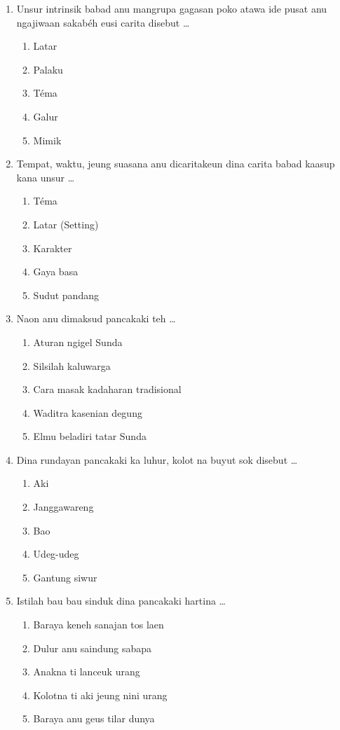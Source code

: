 \documentclass[12pt,a4paper]{article}
\begin{document}
\begin{enumerate}[leftmargin=*]
\item Unsur intrinsik babad anu mangrupa gagasan poko atawa ide pusat anu ngajiwaan sakabéh eusi carita disebut \dots
    \begin{enumerate}[label=\alph*.]
        \item Latar
        \item Palaku
        \item Téma
        \item Galur
        \item Mimik
    \end{enumerate}

\item Tempat, waktu, jeung suasana anu dicaritakeun dina carita babad kaasup kana unsur \dots
    \begin{enumerate}[label=\alph*.]
        \item Téma
        \item Latar (Setting)
        \item Karakter
        \item Gaya basa
        \item Sudut pandang
    \end{enumerate}

\item Naon anu dimaksud pancakaki teh \dots
    \begin{enumerate}[label=\alph*.]
        \item Aturan ngigel Sunda
        \item Silsilah kaluwarga
        \item Cara masak kadaharan tradisional
        \item Waditra kasenian degung
        \item Elmu beladiri tatar Sunda
    \end{enumerate}

\item Dina rundayan pancakaki ka luhur, kolot na buyut sok disebut \dots
    \begin{enumerate}[label=\alph*.]
        \item Aki
        \item Janggawareng
        \item Bao
        \item Udeg-udeg
        \item Gantung siwur
    \end{enumerate}

\item Istilah bau bau sinduk dina pancakaki hartina \dots
    \begin{enumerate}[label=\alph*.]
        \item Baraya keneh sanajan tos laen
        \item Dulur anu saindung sabapa
        \item Anakna ti lanceuk urang
        \item Kolotna ti aki jeung nini urang
        \item Baraya anu geus tilar dunya
    \end{enumerate}


\end{enumerate}
\end{document}
